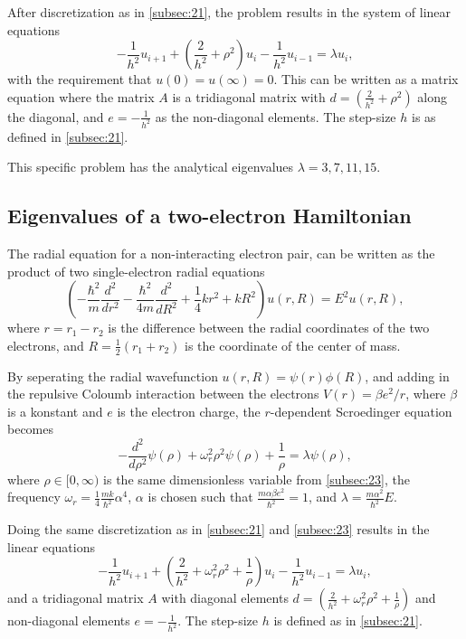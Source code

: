 \documentclass[english,notitlepage,reprint]{revtex4-1}  %
\begin{document}
After discretization as in \autoref{subsec:21}, the problem results in the system of linear equations
$$
	-\frac{1}{h^{2}}u_{i+1}+
	\left(\frac{2}{h^{2}}+\rho^{2}\right)u_{i}-\frac{1}{h^{2}}u_{i-1}=\lambda u_{i},
$$
with the requirement that \(u(0)=u(\infty)=0\)\citep{DepartmentofPhysics2019}. This can be written as a matrix equation where the matrix \(A\) is a tridiagonal matrix with \(d = \left(\frac{2}{h^{2}}+\rho^{2}\right)\) along the diagonal, and \(e = -\frac{1}{h^{2}}\) as the non-diagonal elements. The step-size \(h\) is as defined in \autoref{subsec:21}.

This specific problem has the analytical eigenvalues \(\lambda = 3,7,11,15\)\citep{DepartmentofPhysics2019}.

\subsection{Eigenvalues of a two-electron Hamiltonian}\label{subsec:24}
The radial equation for a non-interacting electron pair, can be written as the product of two single-electron radial equations
$$
	\left(-\frac{\hbar^{2}}{m}\frac{d^{2}}{dr^{2}}-
	\frac{\hbar^{2}}{4m}\frac{d^{2}}{dR^{2}}+\frac{1}{4}kr^{2}+kR^{2}\right)u(r,R) =
	E^{2}u(r,R),
$$
where \(r = r_{1}-r_{2}\) is the difference between the radial coordinates of the two electrons, and \(R = \frac{1}{2}(r_{1}+r_{2})\) is the coordinate of the center of mass\citep{DepartmentofPhysics2019}.

By seperating the radial wavefunction \(u(r,R) = \psi(r)\phi(R)\), and adding in the repulsive Coloumb interaction between the electrons \(V(r)=\beta e^{2}/r\), where \(\beta\)is a konstant and \(e\) is the electron charge, the \(r\)-dependent Scroedinger equation becomes
$$
	-\frac{d^{2}}{d\rho^{2}}\psi(\rho)+\omega_{r}^{2}\rho^{2}\psi(\rho)+\frac{1}{\rho}=
	\lambda\psi(\rho),
$$ 
where \(\rho\in[0,\infty)\) is the same dimensionless variable from \autoref{subsec:23}, the frequency \(\omega_{r}=\frac{1}{4}\frac{mk}{\hbar^{2}}\alpha^{4}\), \(\alpha\) is chosen such that
\(\frac{m\alpha\beta e^{2}}{\hbar^{2}}=1\), and \(\lambda = \frac{m\alpha^{2}}{\hbar^{2}}E\)\citep{DepartmentofPhysics2019}.

Doing the same discretization as in \autoref{subsec:21} and \autoref{subsec:23} results in the linear equations
$$
	-\frac{1}{h^{2}}u_{i+1}+
	\left(\frac{2}{h^{2}}+\omega_{r}^{2}\rho^{2}+\frac{1}{\rho}\right)u_{i}-
	\frac{1}{h^{2}}u_{i-1}=\lambda u_{i},
$$
and a tridiagonal matrix \(A\) with diagonal elements \(d=\left(\frac{2}{h^{2}}+\omega_{r}^{2}\rho^{2}+\frac{1}{\rho}\right)\) and non-diagonal elements \(e=-\frac{1}{h^{2}}\). The step-size \(h\) is defined as in \autoref{subsec:21}.
\end{document}
